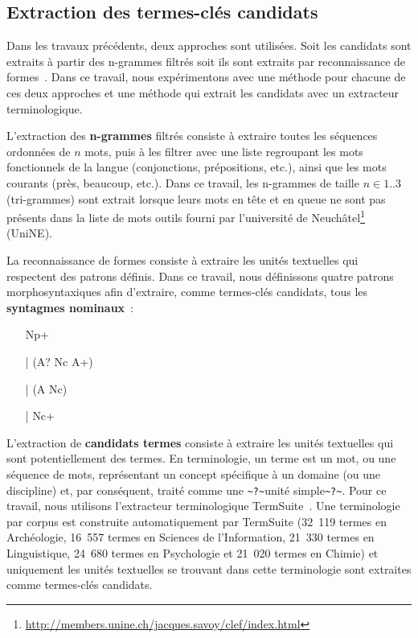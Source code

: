   \subsection{Extraction des termes-clés candidats}
  \label{subsec:extraction_de_termes_cles_candidats}
    Dans les travaux précédents, deux approches sont utilisées. Soit les
    candidats sont extraits à partir des n-grammes filtrés soit ils sont
    extraits par reconnaissance de formes~\cite{hulth2003keywordextraction}.
    Dans ce travail, nous expérimentons avec une méthode pour chacune de ces
    deux approches et une méthode qui extrait les candidats avec un extracteur
    terminologique.

    L'extraction des \textbf{n-grammes} filtrés consiste à extraire toutes les
    séquences ordonnées de $n$ mots, puis à les filtrer avec une liste
    regroupant les mots fonctionnels de la langue (conjonctions, prépositions,
    etc.), ainsi que les mots courants (\og{}près\fg{}, \og{}beaucoup\fg{},
    etc.). Dans ce travail, les n-grammes de taille $n \in {1..3}$ (tri-grammes)
    sont extrait lorsque leurs mots en tête et en queue ne sont pas présents
    dans la liste de mots outils fourni par l'université de
    Neuchâtel\footnote{\url{http://members.unine.ch/jacques.savoy/clef/index.html}}
    (UniNE).

    La reconnaissance de formes consiste à extraire les unités textuelles qui
    respectent des patrons définis. Dans ce travail, nous définissons quatre
    patrons morphosyntaxiques afin d'extraire, comme termes-clés candidats, tous
    les \textbf{syntagmes nominaux}~:
    \begin{itemize}
      \item[]{Np+}
      \item[|]{(A? Nc A+)}
      \item[|]{(A Nc)}
      \item[|]{Nc+}
    \end{itemize}

    L'extraction de \textbf{candidats termes} consiste à extraire les unités
    textuelles qui sont potentiellement des termes. En terminologie, un terme
    est un mot, ou une séquence de mots, représentant un concept spécifique à un
    domaine (ou une discipline) et, par conséquent, traité comme une
    \verb+~?~+unité simple\verb+~?~+. Pour ce travail, nous utilisons
    l'extracteur terminologique TermSuite~\cite{rocheteau2011termsuite}. Une
    terminologie par corpus est construite automatiquement par TermSuite (32~119
    termes en Archéologie, 16~557 termes en Sciences de l'Information, 21~330
    termes en Linguistique, 24~680 termes en Psychologie et 21~020 termes en
    Chimie) et uniquement les unités textuelles se trouvant dans cette
    terminologie sont extraites comme termes-clés candidats.

